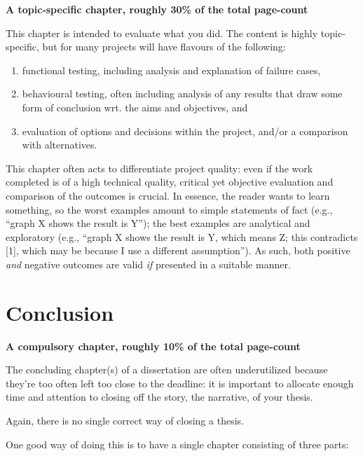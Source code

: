 \documentclass[ %
                    author={Carlos Duran Calle},
                supervisor={Dr. Felipe Campelo},
                    degree={MSc},
                     title={Comparative Machine Learning Analysis for Student Dropout Prediction in a Virtual Learning Environment},
                  subtitle={Incorporating Student Engagement and Socio-Economic Features},
                      type={},
                      year={2025}]{dissertation}
\begin{document}
{\bf A topic-specific chapter, roughly 30\% of the total page-count} 
\vspace{1cm} 

\noindent
This chapter is intended to evaluate what you did.  The content is highly 
topic-specific, but for many projects will have flavours of the following:

\begin{enumerate}
\item functional  testing, including analysis and explanation of failure 
      cases,
\item behavioural testing, often including analysis of any results that 
      draw some form of conclusion wrt. the aims and objectives,
      and
\item evaluation of options and decisions within the project, and/or a
      comparison with alternatives.
\end{enumerate}

\noindent
This chapter often acts to differentiate project quality: even if the work
completed is of a high technical quality, critical yet objective evaluation 
and comparison of the outcomes is crucial.  In essence, the reader wants to
learn something, so the worst examples amount to simple statements of fact 
(e.g., ``graph X shows the result is Y''); the best examples are analytical 
and exploratory (e.g., ``graph X shows the result is Y, which means Z; this 
contradicts [1], which may be because I use a different assumption'').  As 
such, both positive {\em and}\/ negative outcomes are valid {\em if} presented 
in a suitable manner.


\chapter{Conclusion}
\label{chap:conclusion}

{\bf A compulsory chapter,  roughly 10\% of the total page-count}
\vspace{1cm} 

\noindent
The concluding chapter(s) of a dissertation are often underutilized because they're 
too often left too close to the deadline: it is important to allocate enough time and 
attention to closing off the story, the narrative, of your thesis.

Again, there is no single correct way of closing a thesis. 

One good way of doing this is to have a single chapter consisting of three parts:
\end{document}
